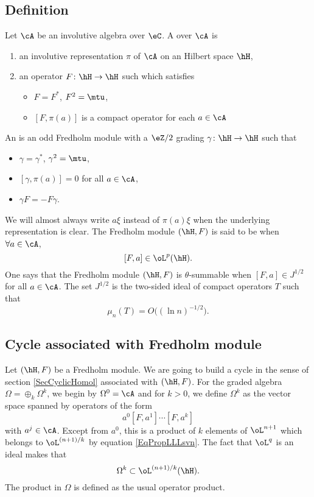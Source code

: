 \subsection{Definition}

Let $\cA$ be an involutive algebra over $\eC$. A  over $\cA$ is 
 \begin{enumerate}
\item an involutive representation $\pi$ of $\cA$ on an Hilbert space $\hH$,
\item an operator $F\colon \hH\to \hH$ such which satisfies 
\begin{itemize}
\item $F=F^*$, $F^2=\mtu$,
\item $[F,\pi(a)]$ is a compact operator for each $a\in\cA$
\end{itemize}

\end{enumerate}

An  is an odd Fredholm module with a $\eZ/2$ grading $\gamma\colon \hH\to \hH$ such that
\begin{itemize}
\item $\gamma=\gamma^*$, $\gamma^2=\mtu$,
\item $[\gamma,\pi(a)]=0$ for all $a\in\cA$,
\item $\gamma F=-F\gamma$.
\end{itemize}
We will almost always write $a\xi$ instead of $\pi(a)\xi$ when the underlying representation is clear. The Fredholm module $(\hH,F)$ is said to be  when $\forall a\in\cA$,
\[ 
  [F,a]\in\oL^p(\hH).
\]
One says that the Fredholm module $(\hH,F)$ is $\theta$-summable when $[F,a]\in J^{1/2}$ for all $a\in\cA$. The set $J^{1/2}$ is the two-sided ideal of compact operators $T$ such that
\[ 
  \mu_n(T)=O\big( (\ln n)^{-1/2} \big).
\]

\subsection{Cycle associated with Fredholm module}

Let $(\hH,F)$ be a Fredholm module. We are going to build a cycle in the sense of section \ref{SecCyclicHomol} associated with $(\hH,F)$. For the graded algebra $\Omega=\oplus_k\Omega^k$, we begin by $\Omega^0=\cA$ and for $k>0$, we define $\Omega^k$ as the vector space spanned by operators of the form
\[ 
  a^0[F,a^1]\cdots[F,a^k]
\]
with $a^{j}\in\cA$. Except from $a^0$, this is a product of $k$ elements of $\oL^{n+1}$ which belongs to $\oL^{(n+1)/k}$ by equation \eqref{EqPropLLLsvn}. The fact that $\oL^q$ is an ideal makes that 
\[ 
  \Omega^k\subset\oL^{(n+1)/k}(\hH).
\]
The product in $\Omega$ is defined as the usual operator product.

